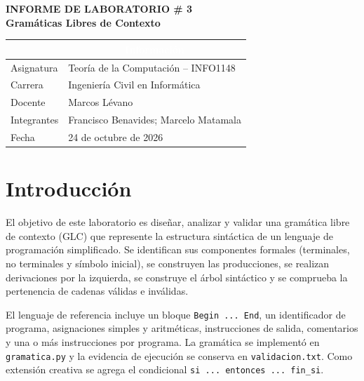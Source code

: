 \documentclass[11pt,letterpaper]{article}
\begin{document}
\begin{center}
  {\Large\bfseries INFORME DE LABORATORIO \# 3}\\[0.35em]
  {\large\bfseries Gramáticas Libres de Contexto}
\end{center}

\vspace{0.5em}

\begin{center}
\begin{tabularx}{0.95\textwidth}{|p{}|X|}
\hline
\rowcolor{azuloscuro}
\multicolumn{1}{|c|}{\textcolor{white}{\textbf{Antecedente}}} &
\multicolumn{1}{c|}{\textcolor{white}{\textbf{Información}}}\\
\hline
Asignatura & Teoría de la Computación -- INFO1148\\
\hline
Carrera & Ingeniería Civil en Informática\\
\hline
Docente & Marcos Lévano\\
\hline
Integrantes & Francisco Benavides; Marcelo Matamala\\
\hline
Fecha & 24 de octubre de 2026\\
\hline
\end{tabularx}
\end{center}

\section{Introducción}

El objetivo de este laboratorio es diseñar, analizar y validar una gramática libre de contexto (GLC) que
represente la estructura sintáctica de un lenguaje de programación simplificado. Se identifican sus
componentes formales (terminales, no terminales y símbolo inicial), se construyen las producciones, se
realizan derivaciones por la izquierda, se construye el árbol sintáctico y se comprueba la pertenencia de
cadenas válidas e inválidas.

El lenguaje de referencia incluye un bloque \lstinline|Begin ... End|, un identificador de programa,
asignaciones simples y aritméticas, instrucciones de salida, comentarios y una o más instrucciones por
programa. La gramática se implementó en \lstinline|gramatica.py| y la evidencia de ejecución se conserva en
\lstinline|validacion.txt|. Como extensión creativa se agrega el condicional
\lstinline|si ... entonces ... fin_si|.
\end{document}
